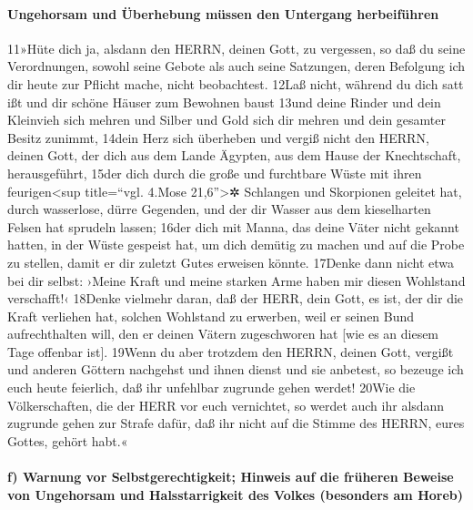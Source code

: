 \hypertarget{ungehorsam-und-uxfcberhebung-muxfcssen-den-untergang-herbeifuxfchren}{%
\paragraph{Ungehorsam und Überhebung müssen den Untergang
herbeiführen}\label{ungehorsam-und-uxfcberhebung-muxfcssen-den-untergang-herbeifuxfchren}}

11»Hüte dich ja, alsdann den HERRN, deinen Gott, zu vergessen, so daß du
seine Verordnungen, sowohl seine Gebote als auch seine Satzungen, deren
Befolgung ich dir heute zur Pflicht mache, nicht beobachtest. 12Laß
nicht, während du dich satt ißt und dir schöne Häuser zum Bewohnen baust
13und deine Rinder und dein Kleinvieh sich mehren und Silber und Gold
sich dir mehren und dein gesamter Besitz zunimmt, 14dein Herz sich
überheben und vergiß nicht den HERRN, deinen Gott, der dich aus dem
Lande Ägypten, aus dem Hause der Knechtschaft, herausgeführt, 15der dich
durch die große und furchtbare Wüste mit ihren feurigen\textless sup
title=``vgl. 4.Mose 21,6''\textgreater✲ Schlangen und Skorpionen
geleitet hat, durch wasserlose, dürre Gegenden, und der dir Wasser aus
dem kieselharten Felsen hat sprudeln lassen; 16der dich mit Manna, das
deine Väter nicht gekannt hatten, in der Wüste gespeist hat, um dich
demütig zu machen und auf die Probe zu stellen, damit er dir zuletzt
Gutes erweisen könnte. 17Denke dann nicht etwa bei dir selbst: ›Meine
Kraft und meine starken Arme haben mir diesen Wohlstand verschafft!‹
18Denke vielmehr daran, daß der HERR, dein Gott, es ist, der dir die
Kraft verliehen hat, solchen Wohlstand zu erwerben, weil er seinen Bund
aufrechthalten will, den er deinen Vätern zugeschworen hat {[}wie es an
diesem Tage offenbar ist{]}. 19Wenn du aber trotzdem den HERRN, deinen
Gott, vergißt und anderen Göttern nachgehst und ihnen dienst und sie
anbetest, so bezeuge ich euch heute feierlich, daß ihr unfehlbar
zugrunde gehen werdet! 20Wie die Völkerschaften, die der HERR vor euch
vernichtet, so werdet auch ihr alsdann zugrunde gehen zur Strafe dafür,
daß ihr nicht auf die Stimme des HERRN, eures Gottes, gehört habt.«

\hypertarget{f-warnung-vor-selbstgerechtigkeit-hinweis-auf-die-fruxfcheren-beweise-von-ungehorsam-und-halsstarrigkeit-des-volkes-besonders-am-horeb}{%
\paragraph{f) Warnung vor Selbstgerechtigkeit; Hinweis auf die früheren
Beweise von Ungehorsam und Halsstarrigkeit des Volkes (besonders am
Horeb)}\label{f-warnung-vor-selbstgerechtigkeit-hinweis-auf-die-fruxfcheren-beweise-von-ungehorsam-und-halsstarrigkeit-des-volkes-besonders-am-horeb}}

